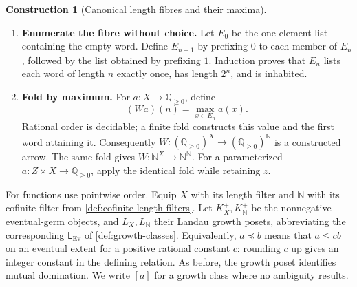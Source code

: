 \documentclass[11pt,a4paper]{article}
\numberwithin{algorithm}{section}
\numberwithin{equation}{section}
\theoremstyle{definition}
\theoremstyle{remark}
\theoremstyle{plain}
\newcommand{\N}{\mathbb N}
\newcommand{\QQ}{\mathbb Q}
\newcommand{\Qplus}{{\QQ_{\ge0}}}
\newcommand{\Ev}{{\operatorname{Ev}}}
\theoremstyle{definition}
\newtheorem{construction}[construction]{Construction}
\theoremstyle{plain}
\begin{document}
\begin{construction}[Canonical length fibres and their maxima]
\label{constr:wc-max}
\leavevmode
\begin{enumerate}[leftmargin=*,align=left]
\item \textbf{Enumerate the fibre without choice.}
Let $E_0$ be the one-element list containing the empty word. Define
$E_{n+1}$ by prefixing $0$ to each member of $E_n$, followed by the list
obtained by prefixing $1$. Induction proves that $E_n$ lists each word
of length $n$ exactly once, has length $2^n$, and is inhabited.
\item \textbf{Fold by maximum.}
For $a:X\to\Qplus$, define
\[
 (Wa)(n)=\max_{x\in E_n}a(x).
\]
Rational order is decidable; a finite fold constructs this value and
the first word attaining it. Consequently $W:(\Qplus)^X\to(\Qplus)^\N$
is a constructed arrow. The same fold gives $W:\N^X\to\N^\N$.
For a parameterized $a:Z\times X\to\Qplus$, apply the identical fold
while retaining $z$.
\end{enumerate}
\end{construction}

For functions use pointwise order. Equip $X$ with its length filter
and $\N$ with its cofinite filter from \cref{def:cofinite-length-filters}.
Let $K_X^+,K_\N^+$ be the nonnegative eventual-germ objects, and
$L_X,L_\N$ their Landau growth posets, abbreviating the
corresponding $\mathsf L_{\Ev}$ of \cref{def:growth-classes}. Equivalently,
$a\preceq b$ means that $a\le c b$ on an eventual extent for a
positive rational constant $c$: rounding $c$ up gives an integer
constant in the defining relation. As before,
the growth poset identifies mutual domination. We write $[a]$ for a
growth class where no ambiguity results.
\end{document}

